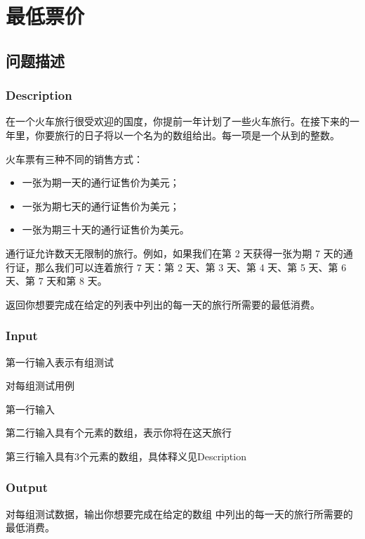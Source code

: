\section{最低票价}
\subsection{问题描述}
\subsubsection*{Description}
在一个火车旅行很受欢迎的国度，你提前一年计划了一些火车旅行。在接下来的一年里，你要旅行的日子将以一个名为的数组给出。每一项是一个从到的整数。

火车票有三种不同的销售方式：

\begin{itemize}
    \item 一张为期一天的通行证售价为美元；
    \item 一张为期七天的通行证售价为美元；
    \item 一张为期三十天的通行证售价为美元。
\end{itemize}

通行证允许数天无限制的旅行。例如，如果我们在第 2 天获得一张为期 7 天的通行证，那么我们可以连着旅行 7 天：第 2 天、第 3 天、第 4 天、第 5 天、第 6 天、第 7 天和第 8 天。

返回你想要完成在给定的列表中列出的每一天的旅行所需要的最低消费。

\subsubsection*{Input}
第一行输入表示有组测试

对每组测试用例

第一行输入

第二行输入具有个元素的数组，表示你将在这天旅行

第三行输入具有3个元素的数组，具体释义见Description

\subsubsection*{Output}

对每组测试数据，输出你想要完成在给定的数组 中列出的每一天的旅行所需要的最低消费。

